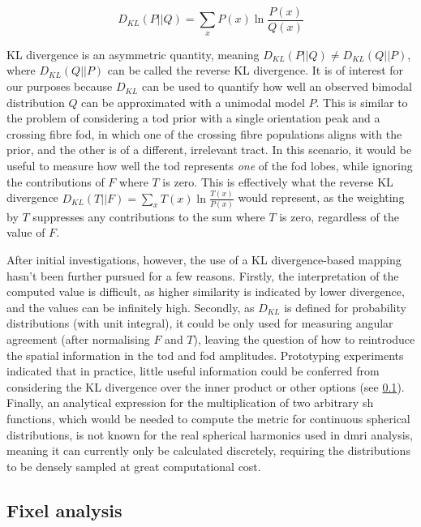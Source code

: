 \begin{equation}
  D_{KL}(P||Q) = \sum_x P(x) \ln \frac{P(x)}{Q(x)} \label{eq:kl}
\end{equation}

KL divergence is an asymmetric quantity, meaning $D_{KL}(P||Q) \neq D_{KL}(Q||P)$, where $D_{KL}(Q||P)$ can be called the reverse KL divergence.
It is of interest for our purposes because $D_{KL}$ can be used to quantify how well an observed bimodal distribution $Q$ can be approximated with a unimodal model $P$.
This is similar to the problem of considering a \gls{tod} prior with a single orientation peak and a crossing fibre \gls{fod}, in which one of the crossing fibre populations aligns with the prior, and the other is of a different, irrelevant tract.
In this scenario, it would be useful to measure how well the \gls{tod} represents \textit{one} of the \gls{fod} lobes, while ignoring the contributions of $F$ where $T$ is zero.
This is effectively what the reverse KL divergence $D_{KL}(T||F) = \sum_x T(x) \ln \frac{T(x)}{P(x)}$ would represent, as the weighting by $T$ suppresses any contributions to the sum where $T$ is zero, regardless of the value of $F$.

After initial investigations, however, the use of a KL divergence-based mapping hasn't been further pursued for a few reasons.
Firstly, the interpretation of the computed value is difficult, as higher similarity is indicated by lower divergence, and the values can be infinitely high.
Secondly, as $D_{KL}$ is defined for probability distributions (with unit integral), it could be only used for measuring angular agreement (after normalising $F$ and $T$), leaving the question of how to reintroduce the spatial information in the \gls{tod} and \gls{fod} amplitudes.
Prototyping experiments indicated that in practice, little useful information could be conferred from considering the KL  divergence over the inner product or other options (see \ref{sec:fixel}).
Finally, an analytical expression for the multiplication of two arbitrary \gls{sh} functions, which would be needed to compute the metric for continuous spherical distributions, is not known for the real spherical harmonics used in \gls{dmri} analysis, meaning it can currently only be calculated discretely, requiring the distributions to be densely sampled at great computational cost.

\subsection{Fixel analysis}\label{sec:fixel}

